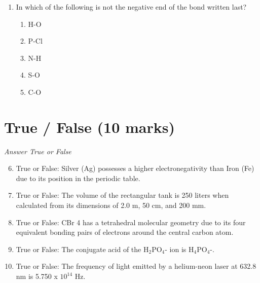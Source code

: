 \documentclass[12pt]{article}
\begin{document}
\begin{enumerate}[label=\arabic*.]
\begin{enumerate}[label=(\alph*)]
    \item All atoms of calcium have 20 protons and 40 neutrons
    \item It contains 20 protons, neutrons, and electrons
    \item All calcium atoms have 20 protons, neutrons, and electrons
    \item All atoms of calcium have a mass of 40.078 u
\end{enumerate}
\item In which of the following is not the negative end of the bond written last?
\begin{enumerate}[label=(\alph*)]
    \item H-O
    \item P-Cl
    \item N-H
    \item S-O
    \item C-O
\end{enumerate}
\end{enumerate}

\section*{True / False (10 marks)}
\textit{Answer True or False}
\begin{enumerate}[label=\arabic*.]
\setcounter{enumi}{5}
\item True or False: Silver (Ag) possesses a higher electronegativity than Iron (Fe) due to its position in the periodic table.
\item True or False: The volume of the rectangular tank is 250 liters when calculated from its dimensions of 2.0 m, 50 cm, and 200 mm.
\item True or False: CBr 4 has a tetrahedral molecular geometry due to its four equivalent bonding pairs of electrons around the central carbon atom.
\item True or False: The conjugate acid of the H$_{2}$PO$_{4}$- ion is H$_{4}$PO$_{4}$-.
\item True or False: The frequency of light emitted by a helium-neon laser at 632.8 nm is 5.750 x $10^14$ Hz.
\end{enumerate}
\end{document}
